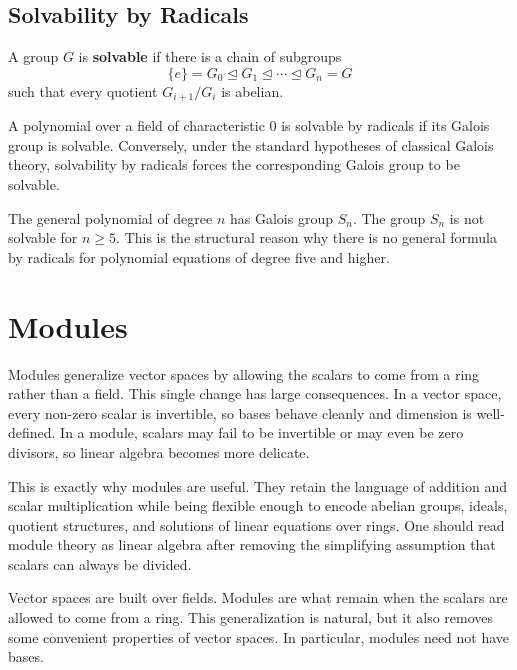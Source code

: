 \subsection{Solvability by Radicals}

\begin{definition}
A group $G$ is \textbf{solvable} if there is a chain of subgroups
\[
    \{e\}=G_0\trianglelefteq G_1\trianglelefteq\cdots\trianglelefteq G_n=G
\]
such that every quotient $G_{i+1}/G_i$ is abelian.
\end{definition}

\begin{theorem}
A polynomial over a field of characteristic $0$ is solvable by radicals if its Galois group is solvable. Conversely, under the standard hypotheses of classical Galois theory, solvability by radicals forces the corresponding Galois group to be solvable.
\end{theorem}

\begin{remark}
The general polynomial of degree $n$ has Galois group $S_n$. The group $S_n$ is not solvable for $n\geq 5$. This is the structural reason why there is no general formula by radicals for polynomial equations of degree five and higher.
\end{remark}

\section{Modules}


Modules generalize vector spaces by allowing the scalars to come from a ring rather than a field. This single change has large consequences. In a vector space, every non-zero scalar is invertible, so bases behave cleanly and dimension is well-defined. In a module, scalars may fail to be invertible or may even be zero divisors, so linear algebra becomes more delicate.

This is exactly why modules are useful. They retain the language of addition and scalar multiplication while being flexible enough to encode abelian groups, ideals, quotient structures, and solutions of linear equations over rings. One should read module theory as linear algebra after removing the simplifying assumption that scalars can always be divided.

Vector spaces are built over fields. Modules are what remain when the scalars are allowed to come from a ring. This generalization is natural, but it also removes some convenient properties of vector spaces. In particular, modules need not have bases.

